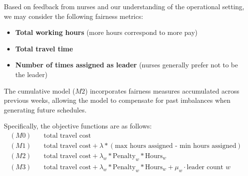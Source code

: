Based on feedback from nurses and our understanding of the operational setting, we may consider the following fairness metrics:

\begin{itemize}
    \item \textbf{Total working hours} (more hours correspond to more pay)
    \item \textbf{Total travel time}
    \item \textbf{Number of times assigned as leader} (nurses generally prefer not to be the leader)
\end{itemize}

The cumulative model ($M2$) incorporates fairness measures accumulated across previous weeks, allowing the model to compensate for past imbalances when generating future schedules.

Specifically, the objective functions are as follows:
\begin{align*}
    (M0) & \quad \text{total travel cost} \\
    (M1) & \quad \text{total travel cost} + \lambda * (\text{max hours assigned - min hours assigned})\\
    (M2) & \quad \text{total travel cost} + \lambda_w * \text{Penalty}_w * \text{Hours}_w\\
    (M3) & \quad \text{total travel cost} + \lambda_w * \text{Penalty}_w * \text{Hours}_w + \mu_w \cdot \text{leader count $w$}\\
\end{align*}

